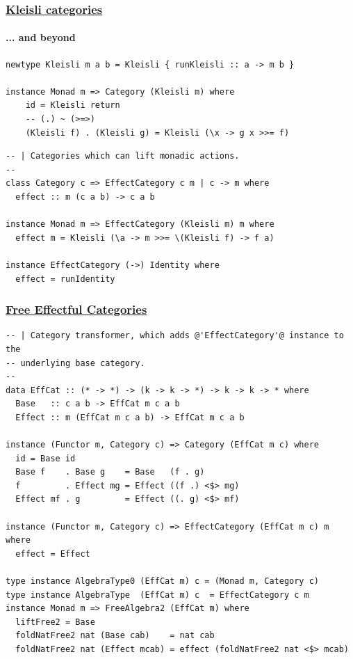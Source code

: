\documentclass[t,dvipsnames]{beamer}
\begin{document}
\begin{frame}[fragile]
    \frametitle{\underline{Kleisli categories}}
    \framesubtitle{... and beyond}
    \vspace{1em}
    \begin{verbatim}
newtype Kleisli m a b = Kleisli { runKleisli :: a -> m b }

instance Monad m => Category (Kleisli m) where
    id = Kleisli return
    -- (.) ~ (>=>)
    (Kleisli f) . (Kleisli g) = Kleisli (\x -> g x >>= f)
    \end{verbatim}

    \begin{verbatim}
-- | Categories which can lift monadic actions.
--
class Category c => EffectCategory c m | c -> m where
  effect :: m (c a b) -> c a b

instance Monad m => EffectCategory (Kleisli m) m where
  effect m = Kleisli (\a -> m >>= \(Kleisli f) -> f a)

instance EffectCategory (->) Identity where
  effect = runIdentity
    \end{verbatim}
\end{frame}

\begin{frame}[fragile]
    \frametitle{\underline{Free Effectful Categories}}
    \begin{verbatim}
-- | Category transformer, which adds @'EffectCategory'@ instance to the
-- underlying base category.
--
data EffCat :: (* -> *) -> (k -> k -> *) -> k -> k -> * where
  Base   :: c a b -> EffCat m c a b
  Effect :: m (EffCat m c a b) -> EffCat m c a b

instance (Functor m, Category c) => Category (EffCat m c) where
  id = Base id
  Base f    . Base g    = Base   (f . g)
  f         . Effect mg = Effect ((f .) <$> mg)
  Effect mf . g         = Effect ((. g) <$> mf)

instance (Functor m, Category c) => EffectCategory (EffCat m c) m where
  effect = Effect

type instance AlgebraType0 (EffCat m) c = (Monad m, Category c)
type instance AlgebraType  (EffCat m) c  = EffectCategory c m
instance Monad m => FreeAlgebra2 (EffCat m) where
  liftFree2 = Base
  foldNatFree2 nat (Base cab)    = nat cab
  foldNatFree2 nat (Effect mcab) = effect (foldNatFree2 nat <$> mcab)
    \end{verbatim}
\end{frame}
\end{document}
